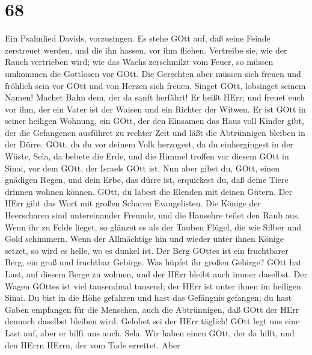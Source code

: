 \hypertarget{section-67}{%
\section{68}\label{section-67}}

 Ein Psalmlied Davids, vorzusingen.  Es stehe
GOtt auf, daß seine Feinde zerstreuet werden, und die ihn hassen, vor
ihm fliehen.  Vertreibe sie, wie der Rauch vertrieben wird;
wie das Wachs zerschmilzt vom Feuer, so müssen umkommen die Gottlosen
vor GOtt.  Die Gerechten aber müssen sich freuen und
fröhlich sein vor GOtt und von Herzen sich freuen.  Singet
GOtt, lobsinget seinem Namen! Machet Bahn dem, der da sanft herfährt! Er
heißt HErr; und freuet euch vor ihm,  der ein Vater ist der
Waisen und ein Richter der Witwen. Er ist GOtt in seiner heiligen
Wohnung,  ein GOtt, der den Einsamen das Haus voll Kinder
gibt, der die Gefangenen ausführet zu rechter Zeit und läßt die
Abtrünnigen bleiben in der Dürre.  GOtt, da du vor deinem
Volk herzogest, da du einhergingest in der Wüste, Sela,  da
bebete die Erde, und die Himmel troffen vor diesem GOtt in Sinai, vor
dem GOtt, der Israels GOtt ist.  Nun aber gibst du, GOtt,
einen gnädigen Regen, und dein Erbe, das dürre ist, erquickest du,
 daß deine Tiere drinnen wohnen können. GOtt, du labest die
Elenden mit deinen Gütern.  Der HErr gibt das Wort mit
großen Scharen Evangelisten.  Die Könige der Heerscharen
sind untereinander Freunde, und die Hausehre teilet den Raub aus.
 Wenn ihr zu Felde lieget, so glänzet es als der Tauben
Flügel, die wie Silber und Gold schimmern.  Wenn der
Allmächtige hin und wieder unter ihnen Könige setzet, so wird es helle,
wo es dunkel ist.  Der Berg GOttes ist ein fruchtbarer
Berg, ein groß und fruchtbar Gebirge.  Was hüpfet ihr
großen Gebirge? GOtt hat Lust, auf diesem Berge zu wohnen, und der HErr
bleibt auch immer daselbst.  Der Wagen GOttes ist viel
tausendmal tausend; der HErr ist unter ihnen im heiligen Sinai.
 Du bist in die Höhe gefahren und hast das Gefängnis
gefangen; du hast Gaben empfangen für die Menschen, auch die
Abtrünnigen, daß GOtt der HErr dennoch daselbst bleiben wird.
 Gelobet sei der HErr täglich! GOtt legt uns eine Last auf,
aber er hilft uns auch. Sela.  Wir haben einen GOtt, der da
hilft, und den HErrn HErrn, der vom Tode errettet.  Aber
